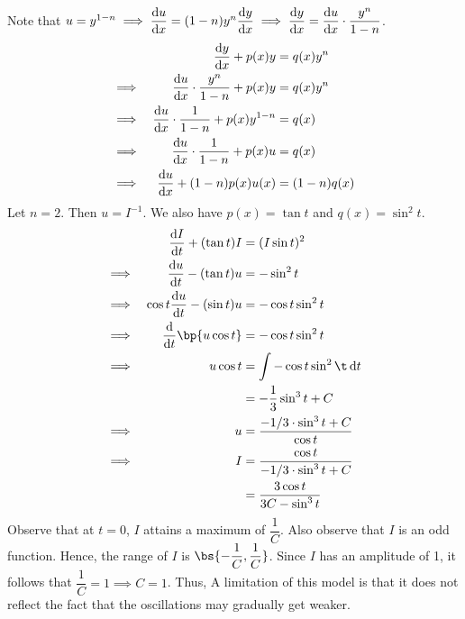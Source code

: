 \documentclass{echw}
\begin{document}
    \solution
        Note that $u = y^{1-n} \implies \dfrac{\mathrm{d} u}{\mathrm{d} x} = (1-n)y^n \dfrac{\mathrm{d} y}{\mathrm{d} x} \implies \dfrac{\mathrm{d} y}{\mathrm{d} x} = \dfrac{\mathrm{d} u}{\mathrm{d} x} \cdot \dfrac{y^n}{1-n}$.
        \begin{alignat*}{2}
            &&\dfrac{\mathrm{d} y}{\mathrm{d} x} + p(x) y &= q(x) y^n\\
            \implies&& \dfrac{\mathrm{d} u}{\mathrm{d} x} \cdot \dfrac{y^n}{1-n} + p(x)y &= q(x) y^n\\
            \implies&& \dfrac{\mathrm{d} u}{\mathrm{d} x} \cdot \dfrac{1}{1-n} + p(x)y^{1-n} &= q(x)\\
            \implies&& \dfrac{\mathrm{d} u}{\mathrm{d} x} \cdot \dfrac{1}{1-n} + p(x)u &= q(x)\\
            \implies&& \dfrac{\mathrm{d} u}{\mathrm{d} x} + (1-n)p(x)u(x) &= (1-n)q(x)
        \end{alignat*}
        Let $n = 2$. Then $u = I^{-1}$. We also have $p(x) = \tan t$ and $q(x) = \sin^2 t$.
        {\allowdisplaybreaks
        \begin{alignat*}{2}
            && \der{I}{t} + (\tan t) I &= (I \sin t)^2\\
            \implies&&\der{u}{t} - (\tan t)u &= -\sin^2 t\\
            \implies&&\cos t \der{u}{t} - (\sin t) u &= -\cos t \sin^2 t\\
            \implies&& \der{}{t} \bp{u \cos t} &= -\cos t \sin^2 t\\
            \implies&& u \cos t &= \int -\cos t \sin^2 \t \d t\\
            && &= -\dfrac13 \sin^3 t + C\\
            \implies&& u &= \dfrac{-1/3 \cdot \sin^3 t + C}{\cos t}\\
            \implies&& I &= \dfrac{\cos t}{-1/3 \cdot \sin^3 t + C}\\
            && &= \dfrac{3\cos t}{3C - \sin^3 t}
        \end{alignat*}}
        Observe that at $t = 0$, $I$ attains a maximum of $\dfrac{1}{C}$. Also observe that $I$ is an odd function. Hence, the range of $I$ is $\bs{-\dfrac1C, \dfrac1C}$. Since $I$ has an amplitude of 1, it follows that $\dfrac1C = 1 \implies C = 1$. Thus,
        A limitation of this model is that it does not reflect the fact that the oscillations may gradually get weaker.
\end{document}

